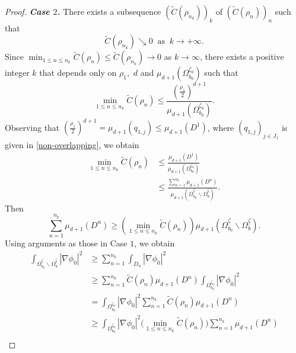 \documentclass[11pt]{article}
\begin{document}
\begin{proof}
	\vspace*{0.25cm}
	\noindent  \textit{\bf Case $2$.} \vspace*{0.25cm}
	There exists a subsequence $\left(\widetilde{C}(\rho_{n_k})\right)_k$ of $\left(\widetilde{C}(\rho_{n})\right)_n$ such that 
	$$\widetilde{C}(\rho_{n_k})  \searrow  0\;\;\text{as}\;\; k\to  +\infty.$$
	Since 
	$\min_{1\le n\le n_k} \widetilde{C}(\rho_{n}) \le  \widetilde{C}  (\rho _{n_k}  )  \to 0$  as $k\to \infty $, there exists a positive integer $k$ that depends only on $\rho_1,$ $d$ and $\mu_{d+1}(\Omega_{b_0}^{\zeta_0})$ such that
    $$\min_{1\le n\le n_k} \widetilde{C}(\rho_{n}) \leq \frac{\left(\frac{\rho_1}{2}\right)^{d+1}}{\mu_{d+1}(\Omega_{b_0}^{\zeta_0})}.$$
Observing that $\left(\frac{\rho_1}{2}\right)^{d+1}=\mu_{d+1}(q_{1,j})\leq \mu_{d+1}(D^1)$, where  $(q_{1,j})_{j\in J_1}$ is given in \eqref{non-overlapping}, we obtain 
    \begin{equation*}
        \begin{split}
            \min_{1\le n\le n_k} \widetilde{C}(\rho_{n})&\leq \frac{\mu_{d+1}(D^1)}{\mu_{d+1}(\Omega_{b_0}^{\zeta_0})}\\
            &\leq \frac{\displaystyle\sum_{n=1}^{n_k} \mu_{d+1} (D^n)}{\mu_{d+1} (\Omega_{b_0}^{\underline{\zeta}}\backslash\Omega_b^{\underline{\zeta}})}.
        \end{split}
    \end{equation*}
    Then 
	$$\displaystyle\sum_{n=1}^{n_k} \mu_{d+1} (D^n)\geq \left( \min_{1\le n\le n_k} \widetilde{C}(\rho_{n}) \right)  \mu_{d+1} (\Omega_{b_0}^{\underline{\zeta}}\backslash\Omega_b^{\underline{\zeta}}). $$
	Using arguments as those in Case $1$, we obtain 
	\begin{equation*}
		\begin{split}
			\displaystyle\int_{\Omega_{b_0}^{\underline{\zeta}}\backslash \Omega_{b}^{\underline{\zeta}}}\left|\nabla\phi_0\right|^2&\geq\displaystyle\sum_{n=1}^{n_k}\displaystyle\int_{D_n}|\nabla\phi_0|^2\\
			&\geq \displaystyle\sum_{n=1}^{n_k}\widetilde{C}(\rho_n)\mu_{d+1} (D^n)\displaystyle\int_{\Omega_{b_0}^{\zeta_0}}|\nabla\phi_0|^2\\
			&= \displaystyle\int_{\Omega_{b_0}^{\zeta_0}}|\nabla\phi_0|^2\displaystyle\sum_{n=1}^{n_k}\widetilde{C}(\rho_{n})\mu_{d+1} (D^n)\\
			&\geq \displaystyle\int_{\Omega_{b_0}^{\zeta_0}}|\nabla\phi_0|^2 \big( \min_{1\leq n\leq n_k}\widetilde{C}(\rho_{n}) \big) \displaystyle\sum_{n=1}^{n_k}\mu_{d+1} (D^n)\\

\end{split}
\end{equation*}
\end{proof}
\end{document}
